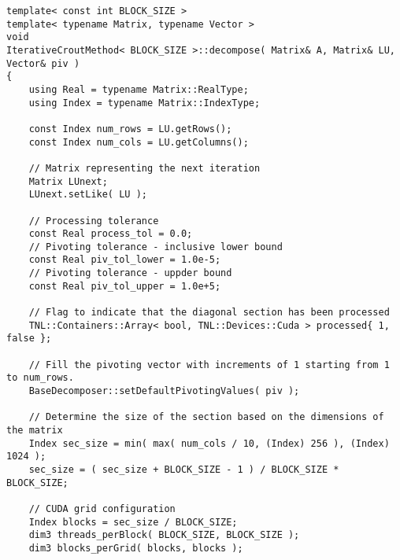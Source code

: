 \begin{lstlisting}[caption={Excerpt from the implementation of ICM\_\textit{x}PP.
The template parameter \code{BLOCK\_SIZE} is equivalent to \textit{x} in ICM\_\textit{x}PP.
On input, matrix \code{A} is assumed to contain the values of $\mathbf{A}$, matrix \code{LU} is assumed to contain the initial estimate of the decomposition, and \code{piv} is expected to be appropriately sized and allocated on the Host.
On output, matrix \code{LU} contains the values of matrices $\mathbf{L}$ and $\mathbf{U}$ in the format presented in Equation~\ref{Equation:implementation->decomposition-project->implemented-solutions->decomposers->CMPP}, and \code{piv} contains the row permutations.
The \code{synchronizeStreams()} function is included below the \code{decompose()} method.
The \code{pivotBadElement()} function is shown in Listing~\ref{Listing:ICMxPP-implementation-pivot-bad-element}.
The code has been slightly modified for brevity, for example, the checks for appropriate sizing of matrices and vectors have been removed.},label={Listing:ICMxPP-implementation-excerpt}]
template< const int BLOCK_SIZE >
template< typename Matrix, typename Vector >
void
IterativeCroutMethod< BLOCK_SIZE >::decompose( Matrix& A, Matrix& LU, Vector& piv )
{
	using Real = typename Matrix::RealType;
	using Index = typename Matrix::IndexType;
	
	const Index num_rows = LU.getRows();
	const Index num_cols = LU.getColumns();
	
	// Matrix representing the next iteration
	Matrix LUnext;
	LUnext.setLike( LU );
	
	// Processing tolerance
	const Real process_tol = 0.0;
	// Pivoting tolerance - inclusive lower bound
	const Real piv_tol_lower = 1.0e-5;
	// Pivoting tolerance - uppder bound
	const Real piv_tol_upper = 1.0e+5;

	// Flag to indicate that the diagonal section has been processed
	TNL::Containers::Array< bool, TNL::Devices::Cuda > processed{ 1, false };
	
	// Fill the pivoting vector with increments of 1 starting from 1 to num_rows.
	BaseDecomposer::setDefaultPivotingValues( piv );
	
	// Determine the size of the section based on the dimensions of the matrix
	Index sec_size = min( max( num_cols / 10, (Index) 256 ), (Index) 1024 );
	sec_size = ( sec_size + BLOCK_SIZE - 1 ) / BLOCK_SIZE * BLOCK_SIZE;
	
	// CUDA grid configuration
	Index blocks = sec_size / BLOCK_SIZE;
	dim3 threads_perBlock( BLOCK_SIZE, BLOCK_SIZE );
	dim3 blocks_perGrid( blocks, blocks );
	

\end{lstlisting}
